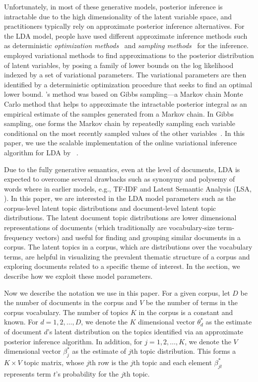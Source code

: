 Unfortunately, in most of these generative models, posterior 
inference is intractable due to the high dimensionality of the 
latent variable space, and practitioners typically rely on 
approximate posterior inference alternatives. For the LDA model, 
people have used different approximate inference methods such as 
deterministic \textsl{optimization methods}~\cite{Blei2003} and 
\textsl{sampling methods}~\cite{Griffiths2004} for the inference. 
\citeauthor{Blei2003} employed variational methods to find 
approximations to the posterior distribution of latent variables, by 
posing a family of lower bounds on the log likelihood indexed 
by a set of variational parameters. The variational parameters are 
then identified by a deterministic optimization procedure that seeks 
to find an optimal lower bound. \citeauthor{Griffiths2004}'s method 
was based on Gibbs sampling---a Markov chain Monte Carlo 
method that helps to approximate the intractable posterior integral 
as an empirical estimate of the samples generated from a Markov chain.   
In Gibbs sampling, one forms the Markov chain by repeatedly sampling 
each variable conditional on the most recently sampled values of the 
other variables~\cite{Geman1984}. In this paper, we use the scalable 
implementation of the online variational inference algorithm for LDA
\cite{hoffman2010online} by~\citeauthor{rehurek_lrec} 
\citeyear{rehurek_lrec}. 


Due to the fully generative semantics, even at the level of 
documents, LDA is expected to overcome several drawbacks such as 
synonymy and polysemy of words where in earlier models, e.g., TF-IDF
\cite{Salton1975} and Latent Semantic Analysis (LSA, \citeauthor{Dumais1995} 
\citeyear{Dumais1995}). In this paper, we are interested in the LDA 
model parameters such as the corpus-level latent topic distributions 
and document-level latent topic distributions. The latent document 
topic distributions are lower dimensional representations of 
documents (which traditionally are vocabulary-size term-frequency vectors) 
and useful for finding and grouping similar documents in a corpus. 
The latent topics in a corpus, which are distributions over the 
vocabulary terms, are helpful in visualizing the prevalent thematic 
structure of a corpus and exploring documents related to a specific 
theme of interest. In the \system section, we describe how we 
exploit these model parameters.   

Now we describe the notation we use in this paper. For a given corpus, 
let $D$ be the number of documents in the corpus and $V$ be the 
number of terms in the corpus vocabulary. The number of topics $K$ 
in the corpus is a constant and known. For $d = 1, 2, \ldots, D$, we 
denote the $K$ dimensional vector $\theta_d^{*}$ as the estimate of 
document $d$'s latent distribution on the topics identified via an 
approximate posterior inference algorithm. In addition, for $j = 1, 
2, \ldots, K$, we denote the $V$ dimensional vector $\beta_j^{*}$ as 
the estimate of $j$th topic distribution. This forms a $K \times V$ 
topic matrix, whose $j$th row is the $j$th topic and each element 
$\beta_{jt}^{*}$ represents term $t$'s probability for the 
$j$th topic.   





